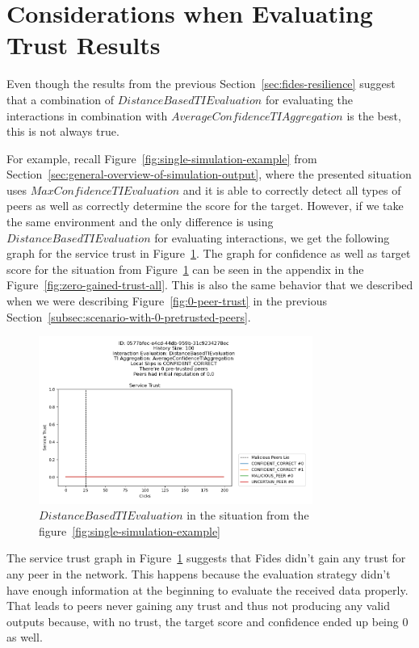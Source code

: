 \newpage
\section{Considerations when Evaluating Trust Results}
\label{sec:other-findings}

Even though the results from the previous Section~\ref{sec:fides-resilience} suggest that a combination of $DistanceBasedTIEvaluation$ for evaluating the interactions in combination with $AverageConfidenceTIAggregation$ is the best, this is not always true.

For example, recall Figure~\ref{fig:single-simulation-example} from Section~\ref{sec:general-overview-of-simulation-output}, where the presented situation uses $MaxConfidenceTIEvaluation$ and it is able to correctly detect all types of peers as well as correctly determine the score for the target.
However, if we take the same environment and the only difference is using $DistanceBasedTIEvaluation$ for evaluating interactions, we get the following graph for the service trust in  Figure~\ref{fig:zero-gained-trust}. The graph for confidence as well as target score for the situation from Figure~\ref{fig:zero-gained-trust} can be seen in the appendix in the Figure~\ref{fig:zero-gained-trust-all}.
This is also the same behavior that we described when we were describing Figure~\ref{fig:0-peer-trust} in the previous Section~\ref{subsec:scenario-with-0-pretrusted-peers}.

\begin{figure}[ht]
    \centering
    \includegraphics[width=0.8\textwidth]{assets/zero_gained_trust.png}
    \caption{$DistanceBasedTIEvaluation$ in the situation from the figure~\ref{fig:single-simulation-example}}
    \label{fig:zero-gained-trust}
\end{figure}

The service trust graph in Figure~\ref{fig:zero-gained-trust} suggests that Fides didn't gain any trust for any peer in the network.
This happens because the evaluation strategy didn't have enough information at the beginning to evaluate the received data properly.
That leads to peers never gaining any trust and thus not producing any valid outputs because, with no trust, the target score and confidence ended up being $0$ as well.